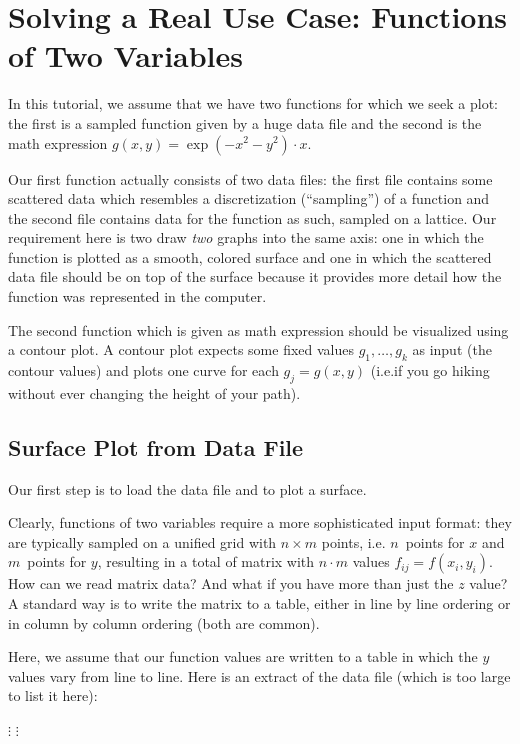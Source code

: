 
\section{Solving a Real Use Case: Functions of Two Variables}

In this tutorial, we assume that we have two functions for which we seek a
plot: the first is a sampled function given by a huge data file and the second
is the math expression $g(x,y)=\exp(-x^2-y^2)\cdot x$.

Our first function actually consists of two data files: the first file contains
some scattered data which resembles a discretization (``sampling'') of a
function and the second file contains data for the function as such, sampled on
a lattice. Our requirement here is two draw \emph{two} graphs into the same
axis: one in which the function is plotted as a smooth, colored surface and one
in which the scattered data file should be on top of the surface because it
provides more detail how the function was represented in the computer.

The second function which is given as math expression should be visualized
using a contour plot. A contour plot expects some fixed values $g_1, \dotsc,
g_k$ as input (the contour values) and plots one curve for each $g_j = g(x,y)$
(i.e.\@ if you go hiking without ever changing the height of your path).


\subsection{Surface Plot from Data File}

Our first step is to load the data file and to plot a surface.

Clearly, functions of two variables require a more sophisticated input format:
they are typically sampled on a unified grid with $n \times m$ points, i.e.\@
$n$~points for $x$ and $m$~points for $y$, resulting in a total of matrix with
$n\cdot m$ values $f_{ij} = f(x_i,y_i)$. How can we read matrix data? And what
if you have more than just the $z$ value? A standard way is to write the matrix
to a table, either in line by line ordering or in column by column ordering
(both are common).

Here, we assume that our function values are written to a table in which the
$y$ values vary from line to line. Here is an extract of the data file (which
is too large to list it here):

        \baselineskip
            $\vdots$
        \baselineskip
        \baselineskip
            $\vdots$

